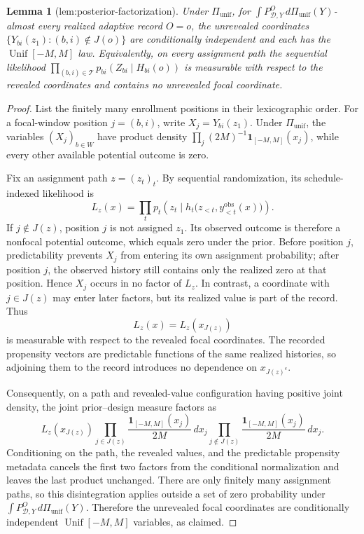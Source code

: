 \documentclass{article}
\newtheorem{lemma}{Lemma}
\begin{document}
\begin{lemma}[lem:posterior-factorization]\label{lem:posterior-factorization}
Under \(\Pi_{\mathrm{unif}}\), for \(\int P^O_{\mathcal D,Y}\,d\Pi_{\mathrm{unif}}(Y)\)-almost every realized adaptive record \(O=o\), the unrevealed coordinates \(\{Y_{bi}(z_1):(b,i)\notin J(o)\}\) are conditionally independent and each has the \(\operatorname{Unif}[-M,M]\) law. Equivalently, on every assignment path the sequential likelihood \(\prod_{(b,i)\in\mathcal T}p_{bi}(Z_{bi}\mid H_{bi}(o))\) is measurable with respect to the revealed coordinates and contains no unrevealed focal coordinate.
\end{lemma}
\begin{proof}
List the finitely many enrollment positions in their lexicographic order.  For a focal-window position \(j=(b,i)\), write \(X_j=Y_{bi}(z_1)\).  Under \(\Pi_{\mathrm{unif}}\), the variables \((X_j)_{b\in W}\) have product density \(\prod_j(2M)^{-1}\mathbf 1_{[-M,M]}(x_j)\), while every other available potential outcome is zero.

Fix an assignment path \(z=(z_t)_t\).  By sequential randomization, its schedule-indexed likelihood is
\[
 L_z(x)=\prod_t p_t\!\left(z_t\mid
 h_t\bigl(z_{<t},y^{\mathrm{obs}}_{<t}(x)\bigr)\right).
\]
If \(j\notin J(z)\), position \(j\) is not assigned \(z_1\).  Its observed outcome is therefore a nonfocal potential outcome, which equals zero under the prior.  Before position \(j\), predictability prevents \(X_j\) from entering its own assignment probability; after position \(j\), the observed history still contains only the realized zero at that position.  Hence \(X_j\) occurs in no factor of \(L_z\).  In contrast, a coordinate with \(j\in J(z)\) may enter later factors, but its realized value is part of the record.  Thus
\[
 L_z(x)=L_z(x_{J(z)})
\]
is measurable with respect to the revealed focal coordinates.  The recorded propensity vectors are predictable functions of the same realized histories, so adjoining them to the record introduces no dependence on \(x_{J(z)^c}\).

Consequently, on a path and revealed-value configuration having positive joint density, the joint prior--design measure factors as
\[
 L_z(x_{J(z)})
 \prod_{j\in J(z)}\frac{\mathbf 1_{[-M,M]}(x_j)}{2M}\,dx_j
 \prod_{j\notin J(z)}\frac{\mathbf 1_{[-M,M]}(x_j)}{2M}\,dx_j.
\]
Conditioning on the path, the revealed values, and the predictable propensity metadata cancels the first two factors from the conditional normalization and leaves the last product unchanged.  There are only finitely many assignment paths, so this disintegration applies outside a set of zero probability under \(\int P^O_{\mathcal D,Y}\,d\Pi_{\mathrm{unif}}(Y)\).  Therefore the unrevealed focal coordinates are conditionally independent \(\operatorname{Unif}[-M,M]\) variables, as claimed.
\end{proof}
\end{document}

